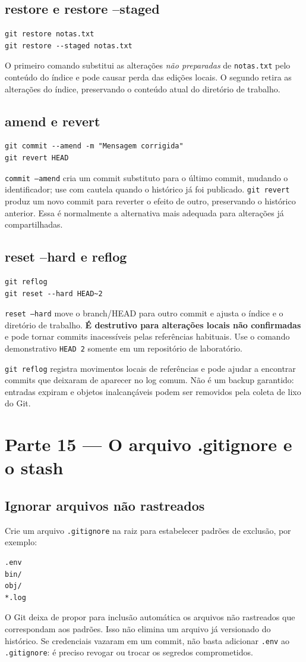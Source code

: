 \documentclass[11pt,a4paper]{article}
\begin{document}
\subsection*{restore e restore --staged}
\begin{lstlisting}
git restore notas.txt
git restore --staged notas.txt
\end{lstlisting}
O primeiro comando substitui as alterações \emph{não preparadas} de \texttt{notas.txt} pelo conteúdo do índice e pode causar perda das edições locais. O segundo retira as alterações do índice, preservando o conteúdo atual do diretório de trabalho.
\subsection*{amend e revert}
\begin{lstlisting}
git commit --amend -m "Mensagem corrigida"
git revert HEAD
\end{lstlisting}
\texttt{commit --amend} cria um commit substituto para o último commit, mudando o identificador; use com cautela quando o histórico já foi publicado. \texttt{git revert} produz um novo commit para reverter o efeito de outro, preservando o histórico anterior. Essa é normalmente a alternativa mais adequada para alterações já compartilhadas.
\subsection*{reset --hard e reflog}
\begin{lstlisting}
git reflog
git reset --hard HEAD~2
\end{lstlisting}
\texttt{reset --hard} move o branch/HEAD para outro commit e ajusta o índice e o diretório de trabalho. \textbf{É destrutivo para alterações locais não confirmadas} e pode tornar commits inacessíveis pelas referências habituais. Use o comando demonstrativo \texttt{HEAD~2} somente em um repositório de laboratório.

\texttt{git reflog} registra movimentos locais de referências e pode ajudar a encontrar commits que deixaram de aparecer no log comum. Não é um backup garantido: entradas expiram e objetos inalcançáveis podem ser removidos pela coleta de lixo do Git.

\section*{Parte 15 --- O arquivo .gitignore e o stash}
\subsection*{Ignorar arquivos não rastreados}
Crie um arquivo \texttt{.gitignore} na raiz para estabelecer padrões de exclusão, por exemplo:
\begin{lstlisting}
.env
bin/
obj/
*.log
\end{lstlisting}
O Git deixa de propor para inclusão automática os arquivos não rastreados que correspondam aos padrões. Isso não elimina um arquivo já versionado do histórico. Se credenciais vazaram em um commit, não basta adicionar \texttt{.env} ao \texttt{.gitignore}: é preciso revogar ou trocar os segredos comprometidos.
\end{document}
